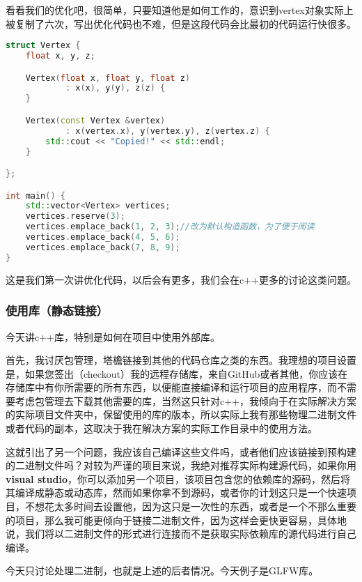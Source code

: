 看看我们的优化吧，很简单，只要知道他是如何工作的，意识到{\ncodestyle vertex}对象实际上被复制了六次，写出优化代码也不难，但是这段代码会比最初的代码运行快很多。

\begin{lstlisting}[language=c++]
struct Vertex {
    float x, y, z;

    Vertex(float x, float y, float z)
            : x(x), y(y), z(z) {
    }

    Vertex(const Vertex &vertex)
            : x(vertex.x), y(vertex.y), z(vertex.z) {
        std::cout << "Copied!" << std::endl;
    }

};

int main() {
    std::vector<Vertex> vertices;
    vertices.reserve(3);
    vertices.emplace_back(1, 2, 3);//改为默认构造函数，为了便于阅读
    vertices.emplace_back(4, 5, 6);
    vertices.emplace_back(7, 8, 9);
}
\end{lstlisting}

这是我们第一次讲优化代码，以后会有更多，我们会在c++更多的讨论这类问题。

\subsubsection{使用库（静态链接）}

今天讲c++库，特别是如何在项目中使用外部库。

首先，我讨厌包管理，塔檐链接到其他的代码仓库之类的东西。我理想的项目设置是，如果您签出（{\ncodestyle checkout}）我的远程存储库，来自{\ncodestyle GitHub}或者其他，你应该在存储库中有你所需要的所有东西，以便能直接编译和运行项目的应用程序，而不需要考虑包管理去下载其他需要的库，当然这只针对c++，我倾向于在实际解决方案的实际项目文件夹中，保留使用的库的版本，所以实际上我有那些物理二进制文件或者代码的副本，这取决于我在解决方案的实际工作目录中的使用方法。

这就引出了另一个问题，我应该自己编译这些文件吗，或者他们应该链接到预构建的二进制文件吗？对较为严谨的项目来说，我绝对推荐实际构建源代码，如果你用\textbf{visual studio}，你可以添加另一个项目，该项目包含您的依赖库的源码，然后将其编译成静态或动态库，然而如果你拿不到源码，或者你的计划这只是一个快速项目，不想花太多时间去设置他，因为这只是一次性的东西，或者是一个不那么重要的项目，那么我可能更倾向于链接二进制文件，因为这样会更快更容易，具体地说，我们将以二进制文件的形式进行连接而不是获取实际依赖库的源代码进行自己编译。

今天只讨论处理二进制，也就是上述的后者情况。今天例子是{\ncodestyle GLFW}库。


